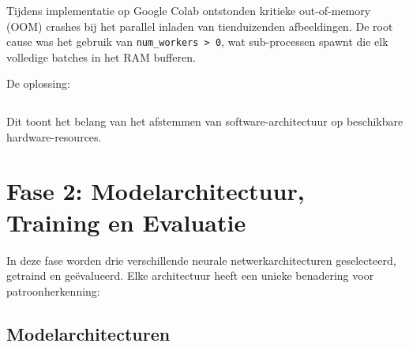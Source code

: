 Tijdens implementatie op Google Colab ontstonden kritieke out-of-memory (OOM) crashes bij het parallel inladen van tienduizenden afbeeldingen. De root cause was het gebruik van \texttt{num\_workers > 0}, wat sub-processen spawnt die elk volledige batches in het RAM bufferen.

De oplossing:
\begin{listing}[H]
    \inputminted[fontsize=\footnotesize, linenos, frame=lines]{python}{code/dataloader_fix.py}
    \caption{Python script voor de hardware-optimalisatie van de dataloader.}
    \label{lst:dataloader_fix}
\end{listing}

Dit toont het belang van het afstemmen van software-architectuur op beschikbare hardware-resources.


\section{Fase 2: Modelarchitectuur, Training en Evaluatie}
\label{sec:fase2}

In deze fase worden drie verschillende neurale netwerkarchitecturen geselecteerd, getraind en geëvalueerd. Elke architectuur heeft een unieke benadering voor patroonherkenning:

\subsection{Modelarchitecturen}


